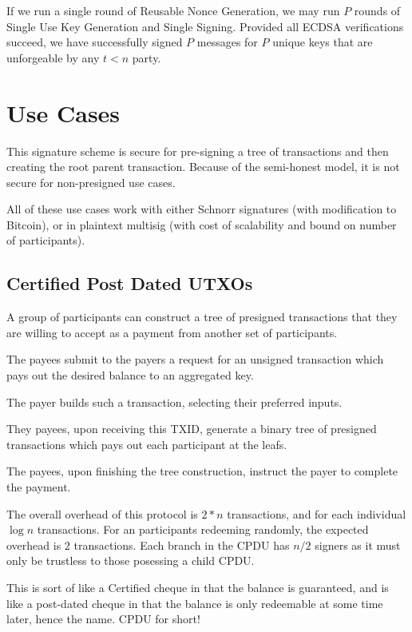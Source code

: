 \documentclass{article}
\begin{document}
If we run a single round of Reusable Nonce Generation, we may run $P$ rounds of
Single Use Key Generation and Single Signing. Provided all ECDSA verifications
succeed, we have successfully signed $P$ messages for $P$ unique keys that are
unforgeable by any $t < n$ party.

\section{Use Cases}

This signature scheme is secure for pre-signing a tree of transactions and then creating the root parent transaction. Because of the semi-honest model, it is not secure for non-presigned use cases.

All of these use cases work with either Schnorr signatures (with modification to Bitcoin), or in plaintext multisig (with cost of scalability and bound on number of participants).



\subsection{Certified Post Dated UTXOs}

A group of participants can construct a tree of presigned transactions that they are willing to accept as a payment from another set of participants.

The payees submit to the payers a request for an unsigned transaction which pays out the desired balance to an aggregated key.

The payer builds such a transaction, selecting their preferred inputs.

They payees, upon receiving this TXID, generate a binary tree of presigned transactions which pays out each participant at the leafs.

The payees, upon finishing the tree construction, instruct the payer to complete the payment.

The overall overhead of this protocol is $2*n$ transactions, and for each individual $\log n$ transactions. For an participants redeeming randomly, the expected overhead is $2$ transactions. Each branch in the CPDU has $n/2$ signers as it must only be trustless to those posessing a child CPDU.

This is sort of like a Certified cheque in that the balance is guaranteed, and is like a post-dated cheque in that the balance is only redeemable at some time later, hence the name. CPDU for short!
\end{document}
